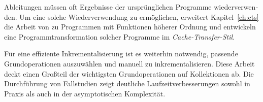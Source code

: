 \begin{otherlanguage}{ngerman}
Ableitungen müssen oft Ergebnisse der ursprünglichen Programme wiederverwenden. Um
eine solche Wiederverwendung zu ermöglichen, erweitert Kapitel~\ref{ch:cts} die
Arbeit von \citet{Liu95} zu Programmen mit Funktionen höherer Ordnung und
entwickeln eine Programmtransformation solcher Programme im \emph{Cache-Transfer-Stil}.

Für eine effiziente Inkrementalisierung ist es weiterhin notwendig, passende
Grundoperationen auszuwählen und manuell zu inkrementalisieren. Diese
Arbeit deckt einen Großteil der wichtigsten Grundoperationen auf
Kollektionen ab. Die Durchführung von Fallstudien zeigt deutliche
Laufzeitverbesserungen sowohl in Praxis als auch in der asymptotischen
Komplexität.

\clearpage
\end{otherlanguage}

